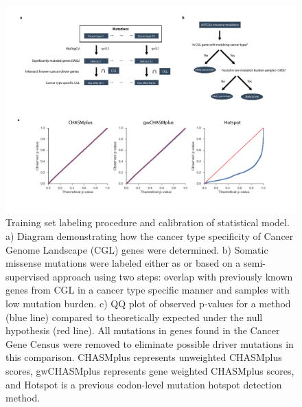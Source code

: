 \begin{figure}
  \centering
  \makeatletter
  \let\@currsize\normalsize
  \includegraphics[width=\linewidth]{figures/chapter6/chasmplus_flow_diagram.pdf}
  \caption[Training set labeling procedure and calibration of statistical model]{Training set labeling procedure and calibration of statistical model. a) Diagram demonstrating how the cancer type specificity of Cancer Genome Landscape (CGL) genes were determined. b) Somatic missense mutations were labeled either as  or  based on a semi-supervised approach using two steps: overlap with previously known genes from CGL in a cancer type specific manner and samples with low mutation burden. c) QQ plot of observed p-values for a method (blue line) compared to theoretically expected under the null hypothesis (red line). All mutations in genes found in the Cancer Gene Census were removed to eliminate possible driver mutations in this comparison. CHASMplus represents unweighted CHASMplus scores, gwCHASMplus represents gene weighted CHASMplus scores, and Hotspot is a previous codon-level mutation hotspot detection method.}
  \label{fig:chasmplus_flow_diagram}
\end{figure}

